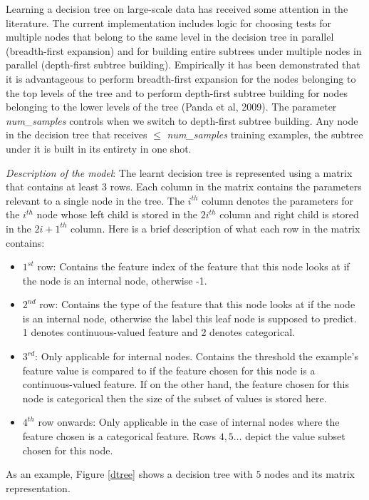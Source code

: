 \par

Learning a decision tree on large-scale data has received  some
attention in the literature. The current implementation includes logic
for choosing tests for multiple nodes that belong to the same level in
the decision tree in parallel (breadth-first expansion) and for
building entire subtrees under multiple nodes in parallel (depth-first
subtree building). Empirically it has been demonstrated that it is
advantageous to perform breadth-first expansion for the nodes
belonging to the top levels of the tree and to perform depth-first
subtree building for nodes belonging to the lower levels of the tree
(Panda et al, 2009). The parameter {\it num\_samples} controls when we
switch to  depth-first subtree building. Any node in the decision tree
that receives $\leq$ {\it num\_samples} training examples, the subtree
under it is built in its entirety in one shot.

\par

{\it Description of the model}: The learnt decision tree is represented using a matrix that
contains at least 3 rows. Each column in the matrix contains the parameters relevant
to a single node in the tree. The $i^{th}$ column denotes the parameters for the $i^{th}$ node
whose left child is stored in the $2i^{th}$ column and right child is stored in the $2i+1^{th}$
column. Here is a brief description of what each row in the matrix contains:
\begin{itemize}
\item $1^{st}$ row: Contains the feature index of the feature that this node looks at if 
the node is an internal node, otherwise -1.
\item $2^{nd}$ row: Contains the type of the feature that this node looks at if the node is
an internal node, otherwise the label this leaf node is supposed to predict. 
1 denotes continuous-valued feature and 2 denotes categorical.
\item $3^{rd}$: Only applicable for internal nodes. Contains the threshold the example's 
feature value is compared to if the feature chosen for this node is a continuous-valued feature. 
If on the other hand, the feature chosen for this node is categorical then the size of the 
subset of values is stored here.
\item $4^{th}$ row onwards: Only applicable in the case of internal nodes where the feature
chosen is a categorical feature. Rows $4, 5 \ldots$ depict the value subset 
chosen for this node.
\end{itemize}
As an example, Figure \ref{dtree} shows a decision tree with $5$ nodes and its matrix
representation.

